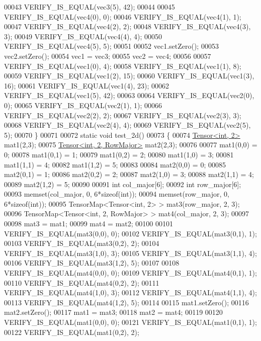 \begin{DoxyCode}
00043   VERIFY\_IS\_EQUAL(vec3(5), 42);
00044 
00045   VERIFY\_IS\_EQUAL(vec4(0), 0);
00046   VERIFY\_IS\_EQUAL(vec4(1), 1);
00047   VERIFY\_IS\_EQUAL(vec4(2), 2);
00048   VERIFY\_IS\_EQUAL(vec4(3), 3);
00049   VERIFY\_IS\_EQUAL(vec4(4), 4);
00050   VERIFY\_IS\_EQUAL(vec4(5), 5);
00051 
00052   vec1.setZero();
00053   vec2.setZero();
00054   vec1 = vec3;
00055   vec2 = vec4;
00056 
00057   VERIFY\_IS\_EQUAL(vec1(0), 4);
00058   VERIFY\_IS\_EQUAL(vec1(1), 8);
00059   VERIFY\_IS\_EQUAL(vec1(2), 15);
00060   VERIFY\_IS\_EQUAL(vec1(3), 16);
00061   VERIFY\_IS\_EQUAL(vec1(4), 23);
00062   VERIFY\_IS\_EQUAL(vec1(5), 42);
00063 
00064   VERIFY\_IS\_EQUAL(vec2(0), 0);
00065   VERIFY\_IS\_EQUAL(vec2(1), 1);
00066   VERIFY\_IS\_EQUAL(vec2(2), 2);
00067   VERIFY\_IS\_EQUAL(vec2(3), 3);
00068   VERIFY\_IS\_EQUAL(vec2(4), 4);
00069   VERIFY\_IS\_EQUAL(vec2(5), 5);
00070 \}
00071 
00072 \textcolor{keyword}{static} \textcolor{keywordtype}{void} test\_2d()
00073 \{
00074   \hyperlink{class_eigen_1_1_tensor}{Tensor<int, 2>} mat1(2,3);
00075   \hyperlink{class_eigen_1_1_tensor}{Tensor<int, 2, RowMajor>} mat2(2,3);
00076 
00077   mat1(0,0) = 0;
00078   mat1(0,1) = 1;
00079   mat1(0,2) = 2;
00080   mat1(1,0) = 3;
00081   mat1(1,1) = 4;
00082   mat1(1,2) = 5;
00083 
00084   mat2(0,0) = 0;
00085   mat2(0,1) = 1;
00086   mat2(0,2) = 2;
00087   mat2(1,0) = 3;
00088   mat2(1,1) = 4;
00089   mat2(1,2) = 5;
00090 
00091   \textcolor{keywordtype}{int} col\_major[6];
00092   \textcolor{keywordtype}{int} row\_major[6];
00093   memset(col\_major, 0, 6*\textcolor{keyword}{sizeof}(\textcolor{keywordtype}{int}));
00094   memset(row\_major, 0, 6*\textcolor{keyword}{sizeof}(\textcolor{keywordtype}{int}));
00095   TensorMap<Tensor<int, 2> > mat3(row\_major, 2, 3);
00096   TensorMap<Tensor<int, 2, RowMajor> > mat4(col\_major, 2, 3);
00097 
00098   mat3 = mat1;
00099   mat4 = mat2;
00100 
00101   VERIFY\_IS\_EQUAL(mat3(0,0), 0);
00102   VERIFY\_IS\_EQUAL(mat3(0,1), 1);
00103   VERIFY\_IS\_EQUAL(mat3(0,2), 2);
00104   VERIFY\_IS\_EQUAL(mat3(1,0), 3);
00105   VERIFY\_IS\_EQUAL(mat3(1,1), 4);
00106   VERIFY\_IS\_EQUAL(mat3(1,2), 5);
00107 
00108   VERIFY\_IS\_EQUAL(mat4(0,0), 0);
00109   VERIFY\_IS\_EQUAL(mat4(0,1), 1);
00110   VERIFY\_IS\_EQUAL(mat4(0,2), 2);
00111   VERIFY\_IS\_EQUAL(mat4(1,0), 3);
00112   VERIFY\_IS\_EQUAL(mat4(1,1), 4);
00113   VERIFY\_IS\_EQUAL(mat4(1,2), 5);
00114 
00115   mat1.setZero();
00116   mat2.setZero();
00117   mat1 = mat3;
00118   mat2 = mat4;
00119 
00120   VERIFY\_IS\_EQUAL(mat1(0,0), 0);
00121   VERIFY\_IS\_EQUAL(mat1(0,1), 1);
00122   VERIFY\_IS\_EQUAL(mat1(0,2), 2);

\end{DoxyCode}

